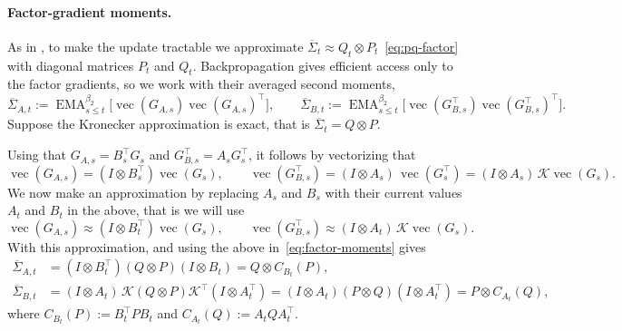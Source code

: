 \documentclass[11pt]{article}
\renewcommand{\vec}{\operatorname{vec}}
\DeclareMathOperator{\EMA}{EMA}
\theoremstyle{plain}
\theoremstyle{definition}
\theoremstyle{remark}
\theoremstyle{definition}
\begin{document}
\paragraph{Factor-gradient moments.}
As in , to make the update tractable we approximate $\overline \Sigma_t \approx Q_t \otimes P_t$~\eqref{eq:pq-factor} with diagonal matrices $P_t$ and $Q_t$. Backpropagation gives efficient access only to the factor gradients, so we work with their averaged second moments,
\begin{equation} \label{eq:factor-moments}
  \overline \Sigma_{A,t}:=\EMA^{\beta_2}_{s\le t}\bigl[\vec(G_{A,s})\vec(G_{A,s})^\top\bigr],
  \qquad
  \overline \Sigma_{B,t}:=\EMA^{\beta_2}_{s\le t}\bigl[\vec(G_{B,s}^\top)\vec(G_{B,s}^\top)^\top\bigr].
\end{equation}
Suppose the Kronecker approximation is exact, that is $\overline \Sigma_t = Q \otimes P$.

Using that $G_{A,s}=B_s^\top G_s$ and $G_{B,s}^\top = A_s G_s^\top$, it follows by vectorizing that
\[
  \vec(G_{A,s}) = (I \otimes B_s^\top)\vec(G_s),
  \qquad
  \vec(G_{B,s}^\top) = (I \otimes A_s)\,\vec(G_s^\top)
    = (I \otimes A_s)\,\mathcal{K}\vec(G_s).
\]
We now make an approximation by replacing $A_s$ and $B_s$ with their current values $A_t$ and $B_t$ in the above, that is we will use
\[
  \vec(G_{A,s}) \approx (I \otimes B_t^\top)\vec(G_s),
  \qquad
  \vec(G_{B,s}^\top) 
    \approx (I \otimes A_t)\,\mathcal{K}\vec(G_s).
\]
 With this approximation, and 
using the above in~\eqref{eq:factor-moments} gives
\begin{equation}\label{eq:observable-moments}
\begin{aligned}
  \overline \Sigma_{A,t} &= (I \otimes B_t^\top)(Q \otimes P)(I \otimes B_t) = Q\otimes C_{B_t}(P),\\
  \overline \Sigma_{B,t} &= (I \otimes A_t)\,\mathcal{K}(Q \otimes P)\mathcal{K}^\top(I \otimes A_t^\top) = (I \otimes A_t)(P \otimes Q)(I \otimes A_t^\top) = P\otimes C_{A_t}(Q),
\end{aligned}
\end{equation}
where $C_{B_t}(P):=B_t^\top P B_t$ and $C_{A_t}(Q):=A_t Q A_t^\top$.
\end{document}
